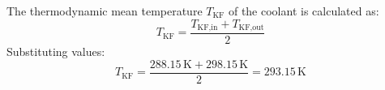 The thermodynamic mean temperature \( T_{\text{KF}} \) of the coolant is calculated as:  
\[
T_{\text{KF}} = \frac{T_{\text{KF,in}} + T_{\text{KF,out}}}{2}
\]  
Substituting values:  
\[
T_{\text{KF}} = \frac{288.15 \, \text{K} + 298.15 \, \text{K}}{2} = 293.15 \, \text{K}
\]